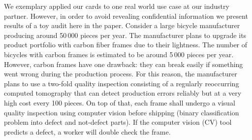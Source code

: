 We exemplary applied our cards to one real world use case at our industry partner. However, in order to avoid revealing confidential information we present results of a toy audit here in the paper.
Consider a large bicycle manufacturer producing around 50\,000 pieces per year. The manufacturer plans to upgrade its product portfolio with carbon fiber frames due to their lightness. The number of bicycles with carbon frames is estimated to be around 5\,000 pieces per year. However, carbon frames have one drawback: they can break easily if something went wrong during the production process. For this reason, the manufacturer plans to use a two-fold quality inspection consisting of a regularly reoccurring computed tomography that can detect production errors reliably but at a very high cost every 100 pieces. On top of that, each frame shall undergo a visual quality inspection using computer vision before shipping (binary classification problem into defect and not-defect parts). If the computer vision (CV) tool predicts a defect, a worker will double check the frame.

